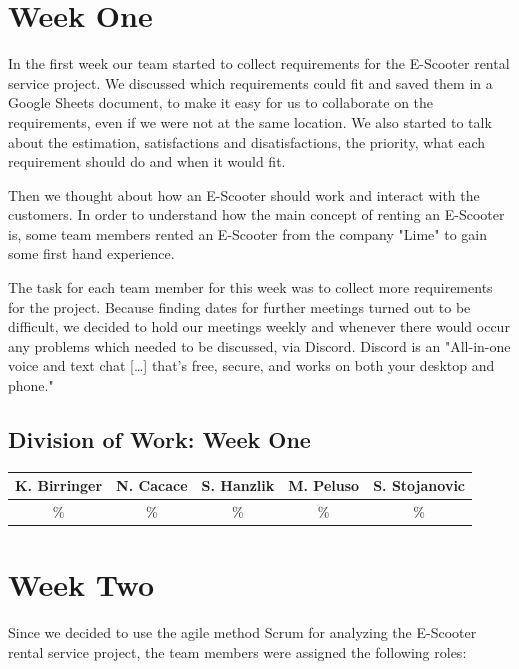 \documentclass[a4paper, 12pt]{article}
\begin{document}
\section{Week One}
In the first week our team started to collect requirements for the E-Scooter rental service project. We discussed which requirements could fit and saved them in a Google Sheets document, to make it easy for us to collaborate on the requirements, even if we were not at the same location. We also started to talk about the estimation, satisfactions and disatisfactions, the priority, what each requirement should do and when it would fit.

Then we thought about how an E-Scooter should work and interact with the customers.
In order to understand how the main concept of renting an E-Scooter is, some team members rented an E-Scooter from the company "Lime" to gain some first hand experience.

The task for each team member for this week was to collect more requirements for the project.
Because finding dates for further meetings turned out to be difficult, we decided to hold our meetings weekly and whenever there would occur any problems which needed to be discussed, via Discord. Discord is an "All-in-one voice and text chat [\ldots] that's free, secure, and works on both your desktop and phone."\cite{discord}

\subsection{Division of Work: Week One}
\begin{table}[h]
\centering
\setlength{\tabcolsep}{10pt}
\begin{tabular}{|c|c|c|c|c|}
\hline
K. Birringer & N. Cacace & S. Hanzlik & M. Peluso & S. Stojanovic\\
\hline
\% & \% & \% & \% & \% \\ 
\hline
\end{tabular}
\end{table}

\section{Week Two}
Since we decided to use the agile method Scrum for analyzing the E-Scooter rental service project, the team members were assigned the following roles:
\end{document}
